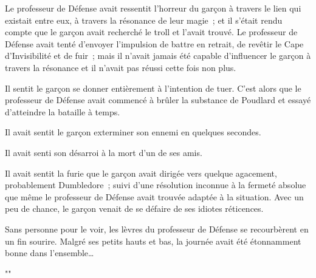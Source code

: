 Le professeur de Défense avait ressentit l'horreur du garçon à travers le lien qui existait entre eux, à travers la résonance de leur magie~; et il s'était rendu compte que le garçon avait recherché le troll et l'avait trouvé. Le professeur de Défense avait tenté d'envoyer l'impulsion de battre en retrait, de revêtir le Cape d'Invisibilité et de fuir~; mais il n'avait jamais été capable d'influencer le garçon à travers la résonance et il n'avait pas réussi cette fois non plus.

Il sentit le garçon se donner entièrement à l'intention de tuer. C'est alors que le professeur de Défense avait commencé à brûler la substance de Poudlard et essayé d'atteindre la bataille à temps.

Il avait sentit le garçon exterminer son ennemi en quelques secondes.

Il avait senti son désarroi à la mort d'un de ses amis.

Il avait sentit la furie que le garçon avait dirigée vers quelque agacement, probablement Dumbledore~; suivi d'une résolution inconnue à la fermeté absolue que même le professeur de Défense avait trouvée adaptée à la situation. Avec un peu de chance, le garçon venait de se défaire de ses idiotes réticences.

Sans personne pour le voir, les lèvres du professeur de Défense se recourbèrent en un fin sourire. Malgré ses petits hauts et bas, la journée avait été étonnamment bonne dans l'ensemble…

"" 

